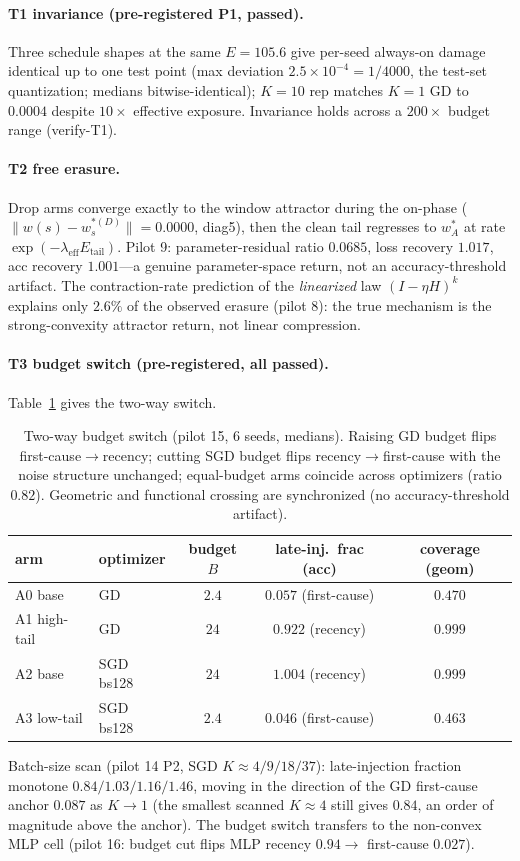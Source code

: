 \documentclass{article}
\newcommand{\Expo}{E}         %
\newcommand{\B}{B}            %
\newcommand{\lam}{\lambda}
\newcommand{\lameff}{\lam_{\mathrm{eff}}}
\begin{document}
\paragraph{T1 invariance (pre-registered P1, passed).} Three schedule shapes at the same
$\Expo=105.6$ give per-seed always-on damage identical up to one test point (max deviation
$2.5\times10^{-4}=1/4000$, the test-set quantization; medians bitwise-identical);
$K{=}10$ rep matches $K{=}1$ GD to $0.0004$ despite $10\times$ effective exposure.
Invariance holds across a $200\times$ budget range (verify-T1).

\paragraph{T2 free erasure.} Drop arms converge exactly to the window attractor during the
on-phase ($\|w(s)-w^{*(D)}_s\|=0.0000$, diag5), then the clean tail regresses to $w^*_A$ at
rate $\exp(-\lameff E_{\mathrm{tail}})$. Pilot 9: parameter-residual ratio $0.0685$, loss
recovery $1.017$, acc recovery $1.001$---a genuine parameter-space return, not an
accuracy-threshold artifact. The contraction-rate prediction of the \emph{linearized} law
$(I-\eta H)^k$ explains only $2.6\%$ of the observed erasure (pilot 8): the true mechanism is
the strong-convexity attractor return, not linear compression.

\paragraph{T3 budget switch (pre-registered, all passed).} Table~\ref{tab:budget} gives the
two-way switch.
\begin{table}[h]
\centering\small
\begin{tabular}{@{}llccc@{}}
\toprule
arm & optimizer & budget $\B$ & late-inj.\ frac (acc) & coverage (geom) \\
\midrule
A0 base & GD & $2.4$ & $0.057$ (first-cause) & $0.470$ \\
A1 high-tail & GD & $24$ & $0.922$ (recency) & $0.999$ \\
A2 base & SGD bs128 & $24$ & $1.004$ (recency) & $0.999$ \\
A3 low-tail & SGD bs128 & $2.4$ & $0.046$ (first-cause) & $0.463$ \\
\bottomrule
\end{tabular}
\caption{Two-way budget switch (pilot 15, 6 seeds, medians). Raising GD budget flips
first-cause$\to$recency; cutting SGD budget flips recency$\to$first-cause with the noise
structure unchanged; equal-budget arms coincide across optimizers (ratio $0.82$). Geometric and
functional crossing are synchronized (no accuracy-threshold artifact).}
\label{tab:budget}
\end{table}
Batch-size scan (pilot 14 P2, SGD $K\approx4/9/18/37$): late-injection fraction monotone
$0.84/1.03/1.16/1.46$, moving in the direction of the GD first-cause anchor $0.087$ as
$K\!\to\!1$ (the smallest scanned $K\approx4$ still gives $0.84$, an order of magnitude
above the anchor). The budget
switch transfers to the non-convex MLP cell (pilot 16: budget cut flips MLP recency $0.94\to$
first-cause $0.027$).
\end{document}
